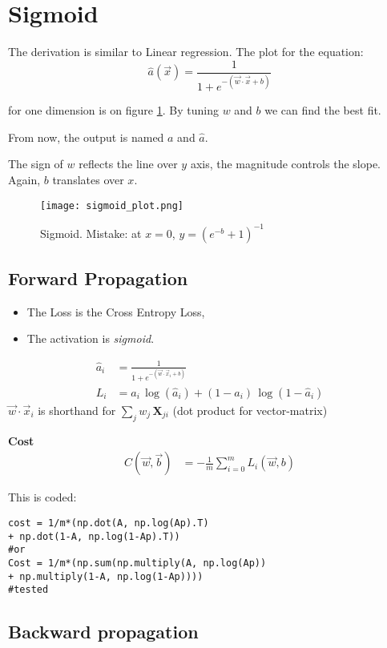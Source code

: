 \section{Sigmoid}
The derivation is similar to Linear regression. The plot for the equation:
\[
  \hat{a}(\vec{x})= \frac{1}{1+e^{-(\vec{w}\cdot{}\vec{x}+b)}}
\]

for one dimension is on figure \ref{fig:sigmoid}. By tuning $w$ and $b$  we can find the best fit. 

From now, the output is named $a$ and $\hat{a}$.

The sign of $w$ reflects the line over $y$ axis, the magnitude controls the slope. Again, $b$ translates over $x$.

\begin{figure}[h]
 \centering
 \texttt{[image: sigmoid\_plot.png]}
  \caption{Sigmoid. Mistake: at $x=0$, $y=(e^{-b}+1)^{-1}$} \label{fig:sigmoid}
\end{figure}

\subsection{Forward Propagation}
\begin{itemize}
  \item The Loss is the Cross Entropy Loss,
  \item The activation is \textit{sigmoid}.
\end{itemize}

\begin{align}
  \hat{a}_i &= \frac{1}{1+e^{-(\vec{w}\cdot \vec{x}_i + b)}}\\
  L_i &= a_i\,\log(\hat{a}_i) + (1-a_i)\,\log(1-\hat{a}_i)
\end{align}
$\vec{w}\cdot{}\vec{x}_i$ is shorthand for $\sum_{j} w_j\,\mathbf{X}_{ji}$ (dot product for vector-matrix)

\textbf{Cost}
\begin{align*}
  C(\vec{w}, \vec{b}) &= -\frac{1}{m}\sum_{i=0}^m L_i(\vec{w}, b)
\end{align*}

This is coded:
\begin{verbatim}
cost = 1/m*(np.dot(A, np.log(Ap).T) 
+ np.dot(1-A, np.log(1-Ap).T))
#or
Cost = 1/m*(np.sum(np.multiply(A, np.log(Ap)) 
+ np.multiply(1-A, np.log(1-Ap))))
#tested
\end{verbatim}

\subsection{Backward propagation}

